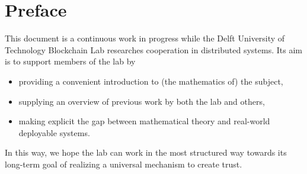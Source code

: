 \chapter{Preface}
This document is a continuous work in progress while the Delft University of Technology Blockchain Lab researches cooperation in distributed systems. 
Its aim is to support members of the lab by
\begin{itemize}
	\item 
	providing a convenient introduction to (the mathematics of) the subject,
	\item
	supplying an overview of previous work by both the lab and others,
	\item
	making explicit the gap between mathematical theory and real-world deployable systems.
\end{itemize}
In this way, we hope the lab can work in the most structured way towards its long-term goal of realizing a universal mechanism to create trust. 